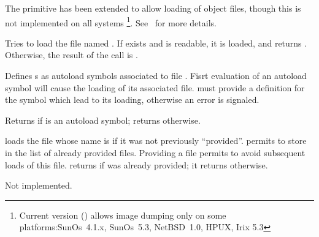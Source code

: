 \begin{entry}{%
}
\saut
\doc

\begin{note}
  The  primitive has been extended to allow loading of
  object files, though this is not implemented on all systems
  \footnote{Current version (\stkversion) allows image dumping
            only on some platforms:SunOs~4.1.x, SunOs~5.3, NetBSD~1.0, 
            HPUX, Irix 5.3}. See~\cite{STkExtension} for more details.
\end{note}
\end{entry}

\begin{entry}{%
}
\saut
Tries to load the file named . If  exists and is
readable, it is loaded, and  returns {\schtrue}. 
Otherwise, the result of the call is {\schfalse}.
\end{entry}

\begin{entry}{%
}
\saut
Defines s as autoload symbols associated to file
. 
Fisrt evaluation of an autoload symbol will cause the loading of its
associated file.  must provide a definition for the symbol which
lead to its loading, otherwise an error is signaled.
\end{entry}

\begin{entry}{%
}
\saut
Returns {\schtrue} if  is an autoload symbol; returns {\schfalse}
otherwise.
\end{entry}

\begin{entry}{%
}
\saut
{} loads the file whose name is  if it was not
previously ``provided''. permits to store  in
the list of already provided files. Providing a file permits to avoid
subsequent loads of this file.  returns {\schtrue} if
 was already provided; it returns {\schfalse} otherwise.
\end{entry}

\begin{entry}{%
\nopagebreak{}
}
\saut
Not implemented.
\end{entry}

